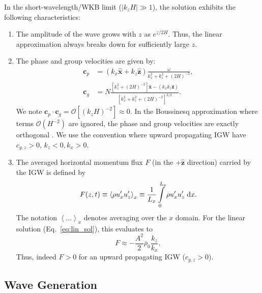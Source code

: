 \documentclass[
        fleqn,
        usenatbib,
        referee,
    ]{mnras}
\newcommand*{\abs}[1]{\left|#1\right|}
\newcommand*{\ev}[1]{\left\langle#1\right\rangle}
\newcommand*{\p}[1]{\left(#1\right)}
\newcommand*{\s}[1]{\left[#1\right]}
\newcommand*{\bm}[1]{\mathbf{#1}}
\newcommand*{\uv}[1]{\hat{\mathbf{#1}}}
\begin{document}
In the short-wavelength/WKB limit ($\abs{k_{z}H} \gg 1$), the solution exhibits
the following characteristics:
\begin{enumerate}
    \item The amplitude of the wave grows with $z$ as $e^{z/2H}$. Thus, the
        linear approximation always breaks down for sufficiently large $z$.

    \item The phase and group velocities are given by:
        \begin{align}
            \bm{c}_{p} &=
                \p{k_{x}\uv{x} + k_{z}\uv{z}}\frac{\omega}
                {k_{x}^2 + k_{z}^2 + \p{2H}^{-2}},\\
            \bm{c}_{g} &= N\frac{\s{k_{z}^2 + \p{2H}^{-2}}\uv{x}
                - \p{k_{x}k_{z}\uv{z}}}
                {\s{k_{x}^2 + k_{z}^2 + \p{2H}^{-2}}^{3/2}}.\label{eq:vg}
        \end{align}
        We note $\bm{c}_{p} \cdot \bm{c}_g = \mathcal{O}\s{\p{k_{z}H}^{-2}}
        \approx 0$. In the Boussinesq approximation where terms
        $\mathcal{O}\p{H^{-2}}$ are ignored, the phase and group velocities are
        exactly orthogonal \citep{drazin,sutherland1}. We use the convention
        where upward propagating IGW have $c_{g, z} > 0$, $k_z < 0, k_x > 0$.

    \item The averaged horizontal momentum flux $F$ (in the $+\uv{z}$
        direction) carried by the IGW is defined by
        \begin{equation}
            F(z, t) \equiv \ev{\rho u_{x}' u_{z}'}_x \equiv
                \frac{1}{L_x}\int_0^{L_x}\limits \rho u_{x}'u_{z}'\;\mathrm{d}x.
                    \label{eq:F_def}
        \end{equation}
        The notation $\ev{\dots}_x$ denotes averaging over the $x$ domain. For
        the linear solution (Eq.~\eqref{eq:lin_sol}), this evaluates to
        \begin{equation}
            F \approx -\frac{A^2}{2}\overline{\rho}_0\frac{k_{z}}{k_{x}},
                    \label{eq:S_lin}
        \end{equation}
        Thus, indeed $F > 0$ for an upward propagating IGW ($c_{g, z} > 0$).
\end{enumerate}

\subsection{Wave Generation}
\end{document}
